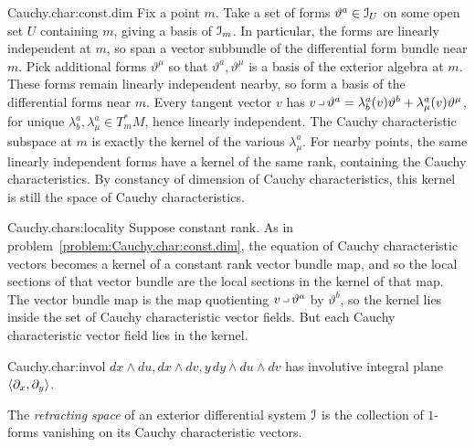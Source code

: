 \begin{answer}{Cauchy.char:const.dim}
Fix a point \(m\). 
Take a set of forms \(\vartheta^a\in \mathcal{I}_U\) on some open set \(U\) containing \(m\), giving a basis of \(\mathcal{I}_m\). 
In particular, the forms are linearly independent at \(m\), so span a vector subbundle of the differential form bundle near \(m\).
Pick additional forms \(\vartheta^{\mu}\) so that \(\vartheta^a,\vartheta^{\mu}\) is a basis of the exterior algebra at \(m\).
These forms remain linearly independent nearby, so form a basis of the differential forms near \(m\).
Every tangent vector \(v\) has \(v \hook \vartheta^a = \lambda^a_b(v)\vartheta^b + \lambda^a_{\mu}(v)\vartheta^{\mu}\), for unique \(\lambda^a_b,\lambda^a_{\mu}\in T^*_m M\), hence linearly independent.
The Cauchy characteristic subspace at \(m\) is exactly the kernel of the various \(\lambda^a_{\mu}\).
For nearby points, the same linearly independent forms have a kernel of the same rank, containing the Cauchy characteristics.
By constancy of dimension of Cauchy characteristics, this kernel is still the space of Cauchy characteristics.
\end{answer}
\begin{answer}{Cauchy.chars:locality}
Suppose constant rank.
As in problem~\vref{problem:Cauchy.char:const.dim}, the equation of Cauchy characteristic vectors becomes a kernel of a constant rank vector bundle map, and so the local sections of that vector bundle are the local sections in the kernel of that map.
The vector bundle map is the map quotienting \(v \hook \vartheta^a\) by \(\vartheta^b\), so the kernel lies inside the set of Cauchy characteristic vector fields.
But each Cauchy characteristic vector field lies in the kernel.
\end{answer}
\begin{answer}{Cauchy.char:invol}
\(dx\wedge du,dx\wedge dv,y \, dy\wedge du\wedge dv\) has involutive integral plane \(\left<\partial_{x},\partial_{y}\right>\).
\end{answer}
The \emph{retracting space} of an exterior differential system \(\mathcal{I}\) is the collection of \(1\)-forms vanishing on its Cauchy characteristic vectors.
